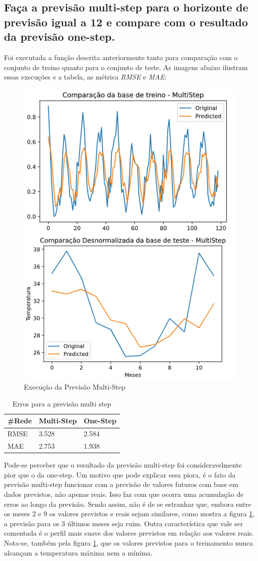 \documentclass[12pt]{article}
\begin{document}
	
	\subsection{Faça a previsão multi-step para o horizonte de previsão igual a 12 e compare com o resultado da previsão one-step.}
	
	Foi executada a função descrita anteriormente tanto para comparação com o conjunto de treino quanto para o conjunto de teste. As imagens abaixo ilustram essas execuções e a tabela, as métrica \textit{RMSE} e \textit{MAE}:
	\begin{figure}[H]
		\centering
		\includegraphics[width=0.5\linewidth]{Imagens/multistep/compMulti.jpg}
		\caption{Execução da Previsão Multi-Step}
		\label{fig:compmulti}
	\end{figure}
	\begin{table}[H]\label{tab:multiErros}
		\begin{tabular}{|l|l|l|}
			\hline
			\#Rede & Multi-Step & One-Step \\ \hline
			RMSE   & 3.528    & 2.584 \\ \hline
			MAE    &  2.753   & 1.938  \\ \hline
		\end{tabular}
		\centering
		\caption{Erros para a previsão multi step}
	\end{table}

	Pode-se perceber que o resultado da previsão multi-step foi consideravelmente pior que o da one-step. Um motivo que pode explicar essa piora, é o fato da previsão multi-step funcionar com a previsão de valores futuros com base em dados previstos, não apenas reais. Isso faz com que ocorra uma acumulação de erros ao longo da previsão. Sendo assim, não é de se estranhar que, embora entre os meses 2 e 9 os valores previstos e reais sejam similares, como mostra a figura \ref{fig:compmulti}, a previsão para os 3 últimos meses seja ruim. Outra característica que vale ser comentada é o perfil mais suave dos valores previstos em relação aos valores reais. Nota-se, também pela figura \ref{fig:compmulti}, que os valores previstos para o treinamento nunca alcançam a temperatura máxima nem a mínima.
	
\end{document}
